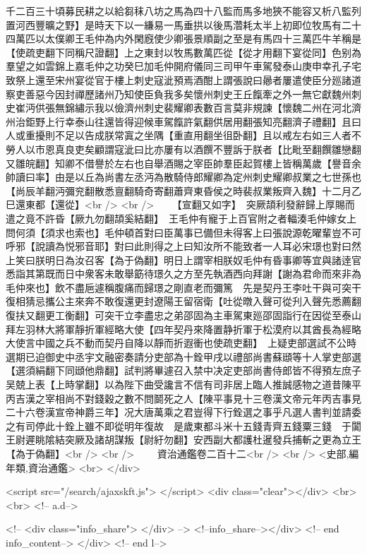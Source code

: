 千二百三十頃募民耕之以給芻秣八坊之馬為四十八監而馬多地狹不能容又析八監列置河西豐曠之野】是時天下以一縑易一馬垂拱以後馬濳耗太半上初即位牧馬有二十四萬匹以太僕卿王毛仲為内外閑廐使少卿張景順副之至是有馬四十三萬匹牛羊稱是【使疏吏翻下同稱尺證翻】上之東封以牧馬數萬匹從【從才用翻下宴從同】色别為羣望之如雲錦上嘉毛仲之功癸巳加毛仲開府儀同三司甲午車駕發泰山庚申幸孔子宅致祭上還至宋州宴從官于樓上刺史寇泚預焉酒酣上謂張說曰曏者屢遣使臣分廵諸道察吏善惡今因封禪歷諸州乃知使臣負我多矣懷州刺史王丘餼牽之外一無它獻魏州刺史崔沔供張無錦繡示我以儉濟州刺史裴耀卿表數百言莫非規諫【懷魏二州在河北濟州治鉅野上行幸泰山往還皆得迎候車駕餼許氣翻供居用翻張知亮翻濟子禮翻】且曰人或重擾則不足以告成朕常寘之坐隅【重直用翻坐徂卧翻】且以戒左右如三人者不勞人以市恩真良吏矣顧謂寇泚曰比亦屢有以酒饌不豐訴于朕者【比毗至翻饌雛戀翻又雛皖翻】知卿不借譽於左右也自舉酒賜之宰臣帥羣臣起賀樓上皆稱萬歲【譽音余帥讀曰率】由是以丘為尚書左丞沔為散騎侍郎耀卿為定州刺史耀卿叔業之七世孫也【尚辰羊翻沔彌兖翻散悉亶翻騎奇寄翻蕭齊東昏侯之時裴叔業叛齊入魏】十二月乙巳還東都【還從】<br />
<br />
　　【宣翻又如字】　突厥頡利發辭歸上厚賜而遣之竟不許昏【厥九勿翻頡奚結翻】　王毛仲有寵于上百官附之者輻湊毛仲嫁女上問何須【須求也索也】毛仲頓首對曰臣萬事已備但未得客上曰張說源乾曜輩豈不可呼邪【說讀為悦邪音耶】對曰此則得之上曰知汝所不能致者一人耳必宋璟也對曰然上笑曰朕明日為汝召客【為于偽翻】明日上謂宰相朕奴毛仲有昏事卿等宜與諸逹官悉詣其第既而日中衆客未敢舉筯待璟久之方至先執酒西向拜謝【謝為君命而來非為毛仲來也】飲不盡巵遽稱腹痛而歸璟之剛直老而彌篤　先是契丹王李吐干與可突干復相猜忌攜公主來奔不敢復還更封遼陽王留宿衛【吐從暾入聲可從刋入聲先悉薦翻復扶又翻更工衡翻】可突干立李盡忠之弟邵固為主車駕東廵邵固詣行在因從至泰山拜左羽林大將軍靜折軍經略大使【四年契丹來降置静折軍于松漠府以其酋長為經略大使言中國之兵不動而契丹自降以靜而折遐衝也使疏吏翻】　上疑吏部選試不公時選期已迫御史中丞宇文融密奏請分吏部為十銓甲戌以禮部尚書蘇頲等十人掌吏部選【選須絹翻下同頲他鼎翻】試判將畢遽召入禁中决定吏部尚書侍郎皆不得預左庶子吴兢上表【上時掌翻】以為陛下曲受讒言不信有司非居上臨人推誠感物之道昔陳平丙吉漢之宰相尚不對錢穀之數不問鬬死之人【陳平事見十三卷漢文帝元年丙吉事見二十六卷漢宣帝神爵三年】况大唐萬乘之君豈得下行銓選之事乎凡選人書判並請委之有司停此十銓上雖不即從明年復故　是歲東都斗米十五錢青齊五錢粟三錢　于闐王尉遲眺隂結突厥及諸胡謀叛【尉紆勿翻】安西副大都護杜暹發兵捕斬之更為立王【為于偽翻】<br />
<br />
　　資治通鑑卷二百十二<br />
<br />
<史部,編年類,資治通鑑>  <br>
   </div> 

<script src="/search/ajaxskft.js"> </script>
 <div class="clear"></div>
<br>
<br>
 <!-- a.d-->

 <!--
<div class="info_share">
</div> 
-->
 <!--info_share--></div>   <!-- end info_content-->
  </div> <!-- end l-->

